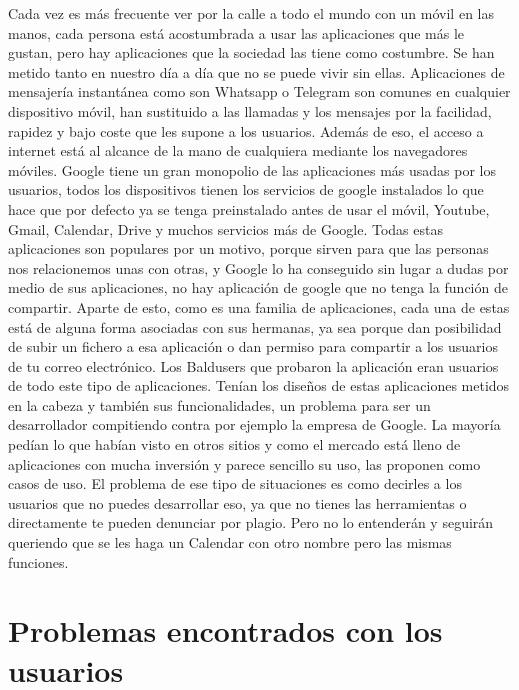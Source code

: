 Cada vez es más frecuente ver por la calle a todo el mundo con un móvil en las manos, cada persona está acostumbrada a usar las aplicaciones que más le gustan, pero hay aplicaciones que la sociedad las tiene como costumbre. Se han metido tanto en nuestro día a día que no se puede vivir sin ellas. Aplicaciones de mensajería instantánea como son Whatsapp o Telegram son comunes en cualquier dispositivo móvil, han sustituido a las llamadas y los mensajes por la facilidad, rapidez y bajo coste que les supone a los usuarios.
Además de eso, el acceso a internet está al alcance de la mano de cualquiera mediante los navegadores móviles.
Google tiene un gran monopolio de las aplicaciones más usadas por los usuarios, todos los dispositivos tienen los servicios de google instalados lo que hace que por defecto ya se tenga preinstalado antes de usar el móvil, Youtube, Gmail, Calendar, Drive y muchos servicios más de Google.
Todas estas aplicaciones son populares por un motivo, porque sirven para que las personas nos relacionemos unas con otras, y Google lo ha conseguido sin lugar a dudas por medio de sus aplicaciones, no hay aplicación de google que no tenga la función de compartir.
Aparte de esto, como es una familia de aplicaciones, cada una de estas está de alguna forma asociadas con sus hermanas, ya sea porque dan posibilidad de subir un fichero a esa aplicación o dan permiso para compartir a los usuarios de tu correo electrónico.
Los Baldusers que probaron la aplicación eran usuarios de todo este tipo de aplicaciones. Tenían los diseños de estas aplicaciones metidos en la cabeza y también sus funcionalidades, un problema para ser un desarrollador compitiendo contra por ejemplo la empresa de Google.
La mayoría pedían lo que habían visto en otros sitios y como el mercado está lleno de aplicaciones con mucha inversión y parece sencillo su uso, las proponen como casos de uso. 
El problema de ese tipo de situaciones es como decirles a los usuarios que no puedes desarrollar eso, ya que no tienes las herramientas o directamente te pueden denunciar por plagio.
Pero no lo entenderán y seguirán queriendo que se les haga un Calendar con otro nombre pero las mismas funciones.


\section{Problemas encontrados con los usuarios}
\label{secc:problemas encontrados con los usuarios}

